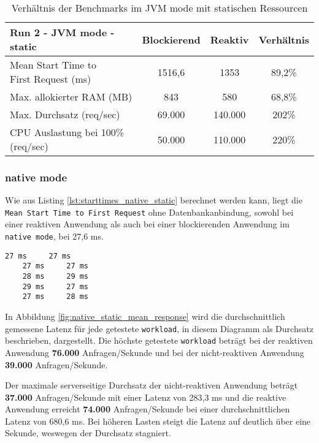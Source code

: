 \begin{table}[ht!]
  \begin{tabular}{|l | c | c | c|}
    \hline
    Run 2 - JVM mode - static & Blockierend & Reaktiv & Verhältnis \\
    \hline
    \makecell[l]{Mean Start Time to                                \\ First Request (ms)} & 1516,6      & 1353  & 89,2\%     \\
    \hline
    Max. allokierter RAM (MB) & 843         & 580     & 68,8\%     \\
    \hline
    Max. Durchsatz (req/sec)  & 69.000      & 140.000 & 202\%      \\
    \hline
    \makecell[l]{CPU Auslastung bei 100\%                          \\ (req/sec)} & 50.000 & 110.000 & 220\%  \\
    \hline
  \end{tabular}
  \caption{Verhältnis der Benchmarks im JVM mode mit statischen Ressourcen}
  \label{table:static_jvm_measurement_results}
\end{table}

\subsubsection{native mode}
\label{subsubsec:static_native_mode}
Wie aus Listing \ref{lst:starttimes_native_static} berechnet werden kann, liegt die \verb|Mean Start Time to First Request|
ohne Datenbankanbindung, sowohl bei einer reaktiven Anwendung als auch bei einer blockierenden
Anwendung im \verb|native mode|, bei 27,6 ms.
\begin{lstlisting}[caption=Startzeiten im native mode mit statischen Ressourcen, captionpos=b, label=lst:starttimes_native_static]
    27 ms     27 ms
    27 ms     27 ms
    28 ms     29 ms
    29 ms     27 ms
    27 ms     28 ms
\end{lstlisting}
In Abbildung \ref{fig:native_static_mean_response} wird die durchschnittlich gemessene Latenz für jede getestete \verb|workload|,
in diesem Diagramm als Durchsatz beschrieben, dargestellt.
Die höchste getestete \verb|workload| beträgt bei der reaktiven Anwendung \textbf{76.000} Anfragen/Sekunde und bei der
nicht-reaktiven Anwendung \textbf{39.000} Anfragen/Sekunde.

Der maximale serverseitige Durchsatz der nicht-reaktiven Anwendung beträgt \textbf{37.000} Anfragen/Sekunde mit einer
Latenz von 283,3 ms und
die reaktive Anwendung erreicht \textbf{74.000} Anfragen/Sekunde bei einer durchschnittlichen Latenz von 680,6 ms.
Bei höheren Lasten steigt die Latenz auf deutlich über eine Sekunde, weswegen der Durchsatz stagniert.

